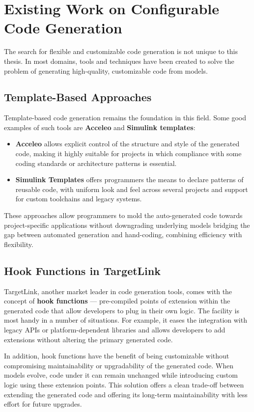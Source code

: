 \section{Existing Work on Configurable Code Generation} \label{sec:configurable_generation}

The search for flexible and customizable code generation is not unique to this thesis. In most domains, tools and techniques have been created to solve the problem of generating high-quality, customizable code from models.

\subsection*{Template-Based Approaches}

Template-based code generation remains the foundation in this field. Some good examples of such tools are \textbf{Acceleo} and \textbf{Simulink templates}: 

\begin{itemize} 
	\item \textbf{Acceleo} allows explicit control of the structure and style of the generated code, making it highly suitable for projects in which compliance with some coding standards or architecture patterns is essential. 
	\item \textbf{Simulink Templates} offers programmers the means to declare patterns of reusable code, with uniform look and feel across several projects and support for custom toolchains and legacy systems.
\end{itemize}

These approaches allow programmers to mold the auto-generated code towards project-specific applications without downgrading underlying models bridging the gap between automated generation and hand-coding, combining efficiency with flexibility.

\subsection*{Hook Functions in TargetLink}

TargetLink, another market leader in code generation tools, comes with the concept of \textbf{hook functions} — pre-compiled points of extension within the generated code that allow developers to plug in their own logic. The facility is most handy in a number of situations. For example, it eases the integration with legacy APIs or platform-dependent libraries and allows developers to add extensions without altering the primary generated code.
\par
In addition, hook functions have the benefit of being customizable without compromising maintainability or upgradability of the generated code. When models evolve, code under it can remain unchanged while introducing custom logic using these extension points. This solution offers a clean trade-off between extending the generated code and offering its long-term maintainability with less effort for future upgrades.


